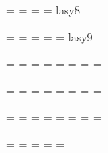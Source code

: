  \font\egtrm  =  \@rm{}
 \font\egtit  =  \@it{}
 \@loadsy{}
 \@font{}
 \@font{}
 \@ttfont{}
 \@font{}
 \@font{}
 \font\egtms  =  \@ms{}
 \@loadcmsy{}
 \@loadcmmi{}
 \font\egtly  =  lasy8

 \font\ninrm  =  \@rm{}
 \font\ninit  =  \@it{}
 \@loadsy{}
 \font\ninbf  =  \@bf{} 
 \@font{}
 \@loadtt{}
 \@font{}
 \@font{}
 \font\ninms  =  \@ms{}
 \@loadcmsy{}
 \@loadcmmi{}
 \font\ninly  =  lasy9

 \font\tenrm  =  \@rm{}
 \font\tenit  =  \@it{}
 \@loadsy{}
 \font\tenbf  =  \@bf{}
 \font\tensl  =  \@sl{}
 \@loadtt{}
 \font\tensf  =  \@sf{}
 \font\tensc  =  \@sc{}
 \font\tenms  =  \@ms{}
 \@loadcmsy\tencmsy{\@msyten}
 \@loadcmmi\tenmi{\@mmiten}
 \font\tenly  =  \@lasyten

 \font\elvrm  =  \@rm\@halfmag
 \font\elvit  =  \@it\@halfmag
 \@loadsy\elvsy	{\@sy\@halfmag}
 \font\elvbf  =  \@bf\@halfmag
 \font\elvsl  =  \@sl\@halfmag
 \@loadtt\elvtt	{\@tt\@halfmag}
 \font\elvsf  =  \@sf\@halfmag
 \font\elvsc  =  \@sc\@halfmag
 \font\elvms  =  \@ms\@halfmag
 \@loadcmsy\elvcmsy{\@msyten\@halfmag}
 \@loadcmmi\elvmi{\@mmiten\@halfmag}
 \font\elvly  =  \@lasyten\@halfmag

 \font\twlrm  =  \@rm{}
 \font\twlit  =  \@it{}
 \@loadsy{}
 \font\twlbf  =  \@bf{}
 \font\twlsl  =  \@sl{}
 \@loadtt{}
 \font\twlsf  =  \@sf{}
 \font\twlsc  =  \@sc{}
 \font\twlms  =  \@ms{}
 \@loadcmsy{}
 \@loadcmmi{}
 \font\twlly  =  \@lasyten{}

 \font\frtnrm  = \@rm{}
 \font\frtnit  = \@it{}
 \@loadsy{}
 \font\frtnbf  = \@bf{}
 \@font{}
 \@font{}
 \@font{}
 \@font{}
 \font\frtnms  = \@ms{}
 \@loadcmsy{}
 \@loadcmmi{}
 \font\frtnly  = \@lasyten{}

